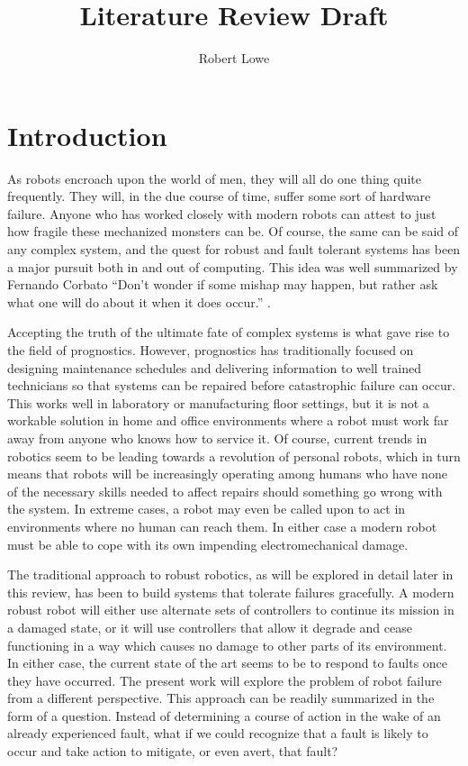 \documentclass[12pt]{article}
\title{Literature Review Draft}
\author{Robert Lowe}
\begin{document}
\maketitle

\section{Introduction}
As robots encroach upon the world of men, they will all do one thing
quite frequently.  They will, in the due course of time, suffer some
sort of hardware failure.  Anyone who has worked closely with modern
robots can attest to just how fragile these mechanized monsters can
be.  Of course, the same can be said of any complex system, and the
quest for robust and fault tolerant systems has been a major pursuit
both in and out of computing.  This idea was well summarized by
Fernando Corbato ``Don't wonder if some mishap may happen, but rather
ask what one will do about it when it does occur.''  \cite{corbato}.

Accepting the truth of the ultimate fate of complex systems is what
gave rise to the field of prognostics.  However, prognostics has
traditionally focused on designing maintenance schedules and
delivering information to well trained technicians so that systems can
be repaired before catastrophic failure can occur.  This works well in
laboratory or manufacturing floor settings, but it is not a workable
solution in home and office environments where a robot must work far
away from anyone who knows how to service it.  Of course, current
trends in robotics seem to be leading towards a revolution of personal
robots, which in turn means that robots will be increasingly operating
among humans who have none of the necessary skills needed to affect
repairs should something go wrong with the system.  In extreme cases,
a robot may even be called upon to act in environments where no human
can reach them.  In either case a modern robot must be able to cope
with its own impending electromechanical damage.

The traditional approach to robust robotics, as will be explored in
detail later in this review, has been to build systems that tolerate
failures gracefully.  A modern robust robot will either use alternate
sets of controllers to continue its mission in a damaged state, or it
will use controllers that allow it degrade and cease functioning in a
way which causes no damage to other parts of its environment.  In
either case, the current state of the art seems to be to respond to
faults once they have occurred. The present work will explore the
problem of robot failure from a different perspective. This approach
can be readily summarized in the form of a question.  Instead of
determining a course of action in the wake of an already experienced
fault, what if we could recognize that a fault is likely to occur and
take action to mitigate, or even avert, that fault?
\end{document}
